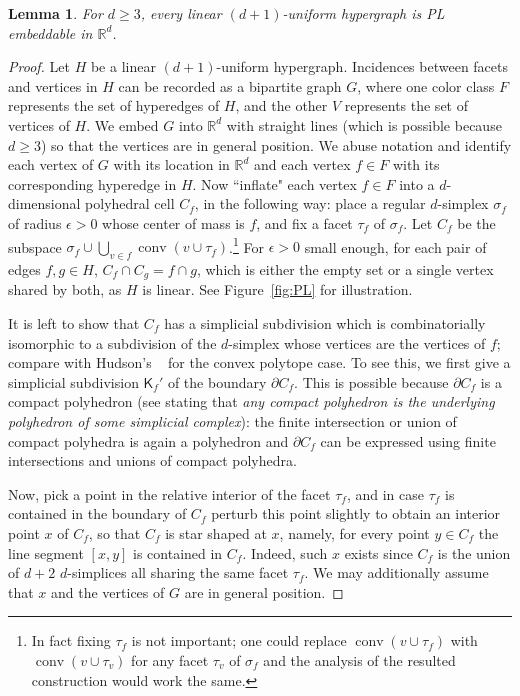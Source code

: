 \documentclass{article}
\newcommand{\RR}{\mathbb{R}}
\newtheorem{lemma}[thm]{Lemma}
\theoremstyle{definition}
\DeclareMathOperator{\conv}{conv}
\begin{document}
\begin{lemma} \label{lemma_linear_PL-embed}
	For $d \geq 3$, every linear $(d+1)$-uniform hypergraph is PL embeddable in $\RR^d$.	
\end{lemma}
\begin{proof}
Let $H$ be a linear $(d+1)$-uniform hypergraph. Incidences between facets and vertices in $H$ can be recorded as a bipartite graph $G$, where one color class $F$ represents the set of hyperedges of $H$, and the other $V$ represents the set of vertices of $H$. We embed $G$ into $\RR^d$ with straight lines (which is possible because $d\geq 3$) so that the vertices are in general position. 
We abuse notation and identify each vertex of $G$ with its location in $\RR^d$ and each vertex $f\in F$ with its corresponding hyperedge in $H$.
Now ``inflate" each vertex $f\in F$ into a $d$-dimensional polyhedral cell $C_f$, in the following way: place a regular $d$-simplex $\sigma_f$ of radius $\epsilon>0$ whose center of mass is $f$, and fix a facet $\tau_f$ of $\sigma_f$. Let $C_f$ be the subspace $\sigma_f\cup\bigcup_{v\in f}\conv(v\cup \tau_f)$.\footnote{In fact fixing $\tau_f$ is not important; one could replace $\conv(v\cup \tau_f)$ with $\conv(v\cup \tau_v)$ for any facet $\tau_v$ of $\sigma_f$ and the analysis of the resulted construction would work the same.}
For $\epsilon>0$ small enough, for each pair of edges $f,g\in H$, $C_f\cap C_g=f\cap g$, which is either the empty set or a single vertex shared by both, as $H$ is linear. See Figure~\ref{fig:PL} for illustration. 

It is left to show that $C_f$ has a simplicial subdivision which is combinatorially isomorphic to a subdivision of the $d$-simplex whose vertices are the vertices of $f$; compare with Hudson's
~\cite[I.Lem.1.12]{piecewise_linear_hudson} for the convex polytope case. 
To see this, we first give a simplicial subdivision $\mathsf{K}_f'$ of the boundary $\partial C_f$. This is possible because $\partial C_f$ is a compact polyhedron (see \cite[Theorem 2.11]{pl_book_rourke_sanderson} stating that \textit{any compact polyhedron is the underlying polyhedron of some simplicial complex}): the finite intersection or union of compact polyhedra is again a polyhedron \cite[1.3.(3),(5)]{pl_book_rourke_sanderson} and $\partial C_f$ can be expressed 
using finite intersections and unions of compact polyhedra.

Now, pick a point in the relative interior of  the facet $\tau_f$, and in case $\tau_f$ is contained in the boundary of $C_f$ perturb this point slightly to obtain an interior point $x$ of $C_f$, so that $C_f$ is star shaped at $x$, namely, for every point $y\in C_f$ the line segment $[x,y]$ is contained in $C_f$. Indeed, such $x$ exists since $C_f$ is the union of $d+2$ $d$-simplices all sharing the same facet $\tau_f$. We may additionally assume that $x$ and the vertices of $G$ are in general position.


\end{proof}
\end{document}
